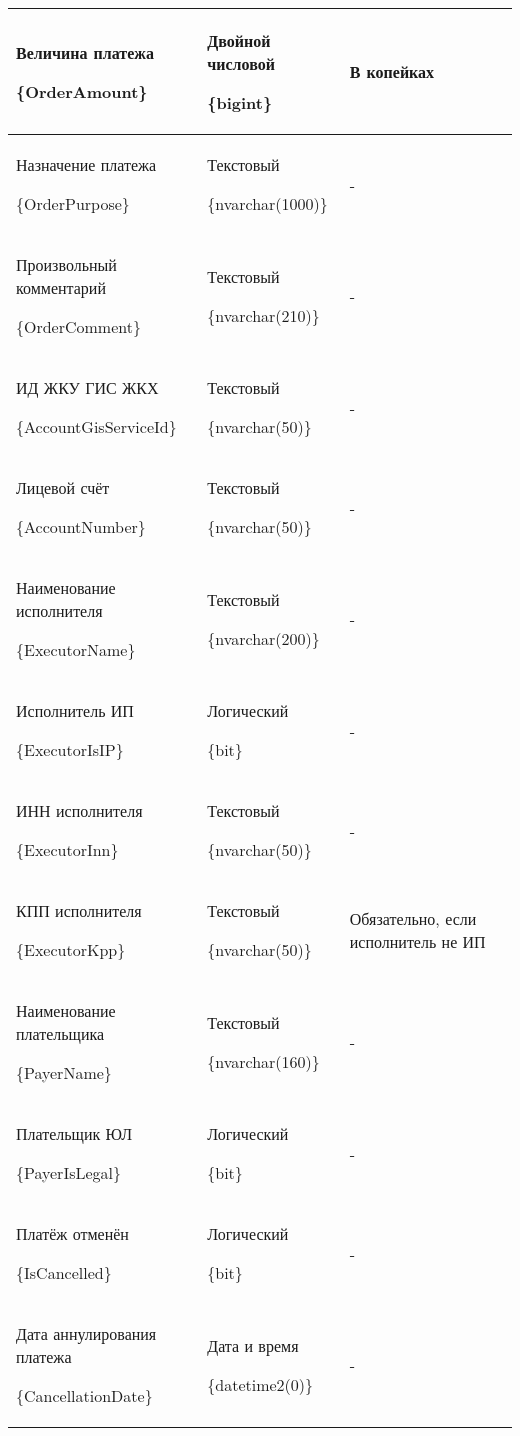 \begin{myTable}
\begin{longtable}[h]{|p{}|p{}|p{}|}
	Величина платежа \par \{OrderAmount\} & Двойной числовой \par \{bigint\} & В копейках \\ \hline
	Назначение платежа \par \{OrderPurpose\} & Текстовый \par \{nvarchar(1000)\} & - \\ \hline
	Произвольный комментарий \par \{OrderComment\} & Текстовый \par \{nvarchar(210)\} & - \\ \hline
	ИД ЖКУ ГИС ЖКХ \par \{AccountGisServiceId\} & Текстовый \par \{nvarchar(50)\} & - \\ \hline
	Лицевой счёт \par \{AccountNumber\} & Текстовый \par \{nvarchar(50)\} & - \\ \hline
	Наименование исполнителя \par \{ExecutorName\} & Текстовый \par \{nvarchar(200)\} & - \\ \hline
	Исполнитель ИП \par \{ExecutorIsIP\} & Логический \par \{bit\} & - \\ \hline
	ИНН исполнителя \par \{ExecutorInn\} & Текстовый \par \{nvarchar(50)\} & - \\ \hline
	КПП исполнителя \par \{ExecutorKpp\} & Текстовый \par \{nvarchar(50)\} & Обязательно, если исполнитель не ИП \\ \hline
	Наименование плательщика \par \{PayerName\} & Текстовый \par \{nvarchar(160)\} & - \\ \hline
	Плательщик ЮЛ \par \{PayerIsLegal\} & Логический \par \{bit\} & - \\ \hline
	Платёж отменён \par \{IsCancelled\} & Логический \par \{bit\} & - \\ \hline
	Дата аннулирования платежа \par \{CancellationDate\} & Дата и время \par \{datetime2(0)\} & - \\ \hline

\end{longtable}
\end{myTable}
